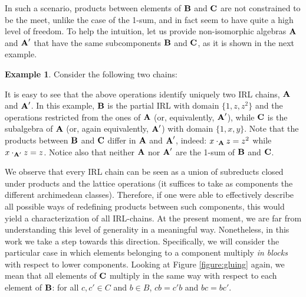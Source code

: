 \documentclass{amsart}
\theoremstyle{definition}
\newtheorem{example}[theorem]{Example}
\numberwithin{equation}{section}
\newcommand{\alg}[1]{{\textbf{\upshape #1}}}  %
\begin{document}
In such a scenario, products between elements of $\alg B$ and $\alg C$ are not constrained to be the meet, unlike the case of the 1-sum, and in fact seem to have quite a high level of freedom. To help the intuition, let us provide non-isomorphic algebras $\alg A$ and $\alg A'$ that have the same subcomponents $\alg B$ and $\alg C$, as it is shown in the next example.
\begin{example}
	Consider the following two chains:
	\begin{center}
\end{center}
   It is easy to see that the above operations identify uniquely two IRL chains, $\alg A$ and $\alg A'$.
 In this example, $\alg B$ is the partial IRL with domain $\{1, z, z^2\}$ and the operations restricted from the ones of $\alg A$ (or, equivalently, $\alg A'$), while $\alg C$ is the subalgebra of $\alg A$ (or, again equivalently, $\alg A'$) with domain $\{1, x, y\}$. Note that the products between $\alg B$ and $\alg C$ differ in $\alg A$ and $\alg A'$, indeed: $x \cdot_{\alg A} z = z^2$ while $x \cdot_{\alg A'} z = z$. Notice also that neither $\alg A$ nor $\alg A'$ are the 1-sum of $\alg B$ and $\alg C$.
\end{example}
We observe that every IRL chain can be seen as a union of subreducts closed under products and the lattice operations (it suffices to take as components the different archimedean classes). Therefore, if one were able to effectively describe all possible ways of redefining products between such components, this would yield a characterization of all IRL-chains. At the present moment, we are far from understanding this level of generality in a meaningful way. Nonetheless, in this work we take a step towards this direction. Specifically, we will consider the particular case in which elements belonging to a component multiply {\em in blocks} with respect to lower components. Looking at Figure \ref{figure:gluing} again, we mean that all elements of $\alg C$ multiply in the same way with respect to each element of $\alg B$: for all $c, c' \in C$ and $b \in B$, $cb = c'b$ and $bc = bc'$. 
\end{document}
